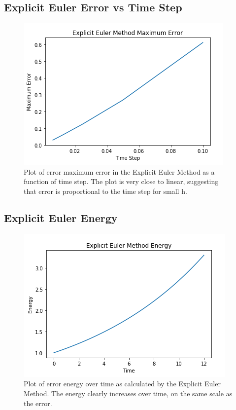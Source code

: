 \documentclass{article}
\begin{document}
\subsection{Explicit Euler Error vs Time Step}

\begin{figure}[ht]
\centering
\includegraphics[scale=0.35]{exp_euler_max_err.png}
\caption{Plot of error maximum error in the Explicit Euler Method as a function of time step. The plot is very close to linear, suggesting that error is proportional to the time step for small h.}
\label{fig:expeulermaxerr}
\end{figure}

\subsection{Explicit Euler Energy}

\begin{figure}[ht]
\centering
\includegraphics[scale=0.35]{exp_euler_energy.png}
\caption{Plot of error energy over time as calculated by the Explicit Euler Method. The energy clearly increases over time, on the same scale as the error.}
\label{fig:expeulerenergy}
\end{figure}
\end{document}
